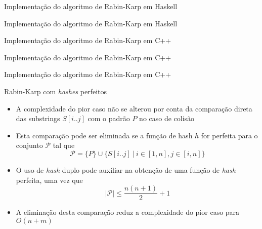 \begin{frame}[fragile]{Implementação do algoritmo de Rabin-Karp em Haskell}
\end{frame}

\begin{frame}[fragile]{Implementação do algoritmo de Rabin-Karp em Haskell}
\end{frame}

\begin{frame}[fragile]{Implementação do algoritmo de Rabin-Karp em C++}
\end{frame}

\begin{frame}[fragile]{Implementação do algoritmo de Rabin-Karp em C++}
\end{frame}

\begin{frame}[fragile]{Implementação do algoritmo de Rabin-Karp em C++}
\end{frame}


\begin{frame}[fragile]{Rabin-Karp com {\it hashes} perfeitos}

    \begin{itemize}
        \item A complexidade do pior caso não se alterou por conta da comparação direta das
            substrings $S[i..j]$ com o padrão $P$ no caso de colisão

        \item Esta comparação pode ser eliminada se a função de hash $h$ for perfeita para 
            o conjunto $\mathcal{P}$ tal que
        \[
            \mathcal{P} = \lbrace P \rbrace \cup \lbrace S[i..j]\ |\ i\in [1,n], j\in [i,n]\rbrace
        \]

        \item O uso de \textit{hash} duplo pode auxiliar na obtenção de uma função de
            \textit{hash} perfeita, uma vez que
            \[
                |\mathcal{P}| \leq \dfrac{n(n + 1)}{2} + 1
            \]
 
        \item A eliminação desta comparação reduz a complexidade do pior caso para 
            $O(n + m)$
    \end{itemize}

\end{frame}

